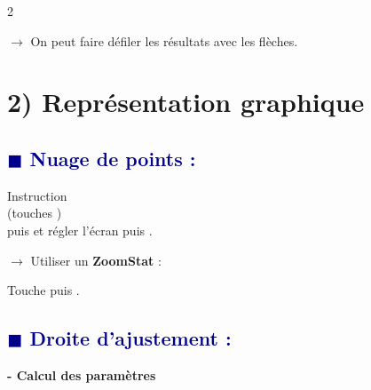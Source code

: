 \documentclass[11pt,a4paper]{article}
\begin{document}
\begin{multicols}{2}
\begin{tcolorbox}[colback=graybox, colframe=darkblue, arc=2mm, boxrule=0.8pt]
    \vspace{0.2cm}
    $\rightarrow$ On peut faire défiler les résultats avec les flèches.
    
    \vspace{0.2cm}
    \scriptsize
\end{tcolorbox}

\columnbreak

\section*{\small 2) Représentation graphique}

\subsection*{\scriptsize \textcolor{darkblue}{$\blacksquare$ Nuage de points :}}

\begin{tcolorbox}[colback=graybox, colframe=darkblue, arc=2mm, boxrule=0.8pt]
    \small
    Instruction  \\
    (touches   ) \\[5mm]
    
    puis   et régler l'écran puis .  
    
    \vspace{0.1cm}
    $\rightarrow$ Utiliser un \textbf{ZoomStat} :
    
    Touche  puis .
\end{tcolorbox}

\vspace{0.2cm}

\subsection*{\scriptsize \textcolor{darkblue}{$\blacksquare$ Droite d'ajustement :}}

\begin{tcolorbox}[colback=graybox, colframe=darkblue, arc=2mm, boxrule=0.8pt]
    \small
    \textbf{- Calcul des paramètres} \\[2mm]
    

\end{tcolorbox}
\end{multicols}
\end{document}

